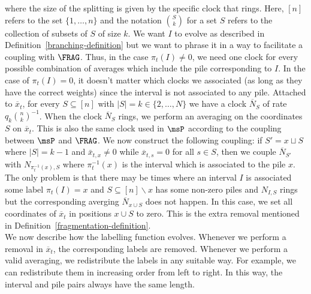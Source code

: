 \documentclass[12pt]{article}
\begin{document}
	where the size of the splitting is given by the specific clock that rings. Here, $[n]$ refers to the set $\{1, \ldots, n\}$ and the notation $\binom{S}{k}$ for a set $S$ refers to the collection of subsets of $S$ of size $k$. We want $I$ to evolve as described in Definition~\ref{branching-definition} but we want to phrase it in a way to facilitate a coupling with $\FRAG$. Thus, in the case $\pi_t(I) \neq 0$, we need one clock for every possible combination of averages which include the pile corresponding to $I$. In the case of $\pi_t(I) = 0$, it doesn't matter which clocks we associated (as long as they have the correct weights) since the interval is not associated to any pile. Attached to $\overline{x}_t$, for every $S \subseteq [n]$ with $|S| = k \in \{2, \ldots, N\}$ we have a clock $\overline{N}_S$ of rate $q_k \binom{n}{k}^{-1}$. When the clock $\overline{N}_S$ rings, we perform an averaging on the coordinates $S$ on $\overline{x}_t$. This is also the same clock used in $\msP$ according to the coupling between $\msP$ and $\FRAG$. We now construct the following coupling: if $S' = x \sqcup S$ where $|S| = k-1$ and $\bar{x}_{t, x} \neq 0$ while $\overline{x}_{t,s} = 0$ for all $s \in S$, then we couple $\overline{N}_{S'}$ with $N_{\pi_t^{-1}(x), S}$ where $\pi_t^{-1}(x)$ is the interval which is associated to the pile $x$. The only problem is that there may be times where an interval $I$ is associated some label $\pi_t(I) = x$ and $S \subseteq [n] \backslash x$ has some non-zero piles and $N_{I, S}$ rings but the corresponding averging $\overline{N}_{x \cup S}$ does not happen. In this case, we set all coordinates of $\overline{x}_t$ in positions $x \cup S$ to zero. This is the extra removal mentioned in Definition~\ref{fragmentation-definition}. \\

	We now describe how the labelling function evolves. Whenever we perform a removal in $\overline{x}_t$, the corresponding labels are removed. Whenever we perform a valid averaging, we redistribute the labels in any suitable way. For example, we can redistribute them in increasing order from left to right. In this way, the interval and pile pairs always have the same length. \\
\end{document}
